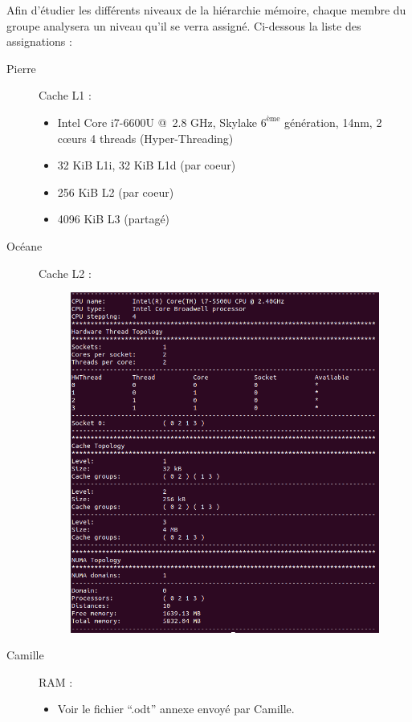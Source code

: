 \documentclass[12pt,a4paper]{article}
\begin{document}
Afin d'étudier les différents niveaux de la hiérarchie mémoire, chaque membre du
groupe analysera un niveau qu'il se verra assigné. Ci-dessous la liste des
assignations :
\begin{description}
    \item[Pierre] Cache L1 : 
        \begin{itemize}
            \item Intel Core i7-6600U @ 2.8 GHz, Skylake $6^{\text{ème}}$ génération, 14nm, 2 cœurs 4 threads (Hyper-Threading)
            \item 32 KiB L1i, 32 KiB L1d (par coeur)
            \item 256 KiB L2 (par coeur)
            \item 4096 KiB L3 (partagé)
        \end{itemize}
    \item[Océane] Cache L2 : 
        \begin{figure}[!h]
		\includegraphics[scale=0.42]{figures/L2/L2topo.png}
		\caption{ }
        \end{figure}
    \item[Camille] RAM : 
        \begin{itemize}
            \item Voir le fichier \enquote{.odt} annexe envoyé par Camille.
        \end{itemize}
\end{description} 
\end{document}

